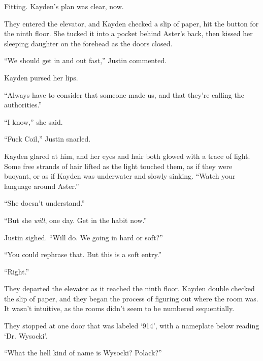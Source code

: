 Fitting.  Kayden's plan was clear, now.



They entered the elevator, and Kayden checked a slip of paper, hit the button for the ninth floor.  She tucked it into a pocket behind Aster's back, then kissed her sleeping daughter on the forehead as the doors closed.



``We should get in and out fast,'' Justin commented.



Kayden pursed her lips.



``Always have to consider that someone made us, and that they're calling the authorities.''



``I know,'' she said.



``Fuck Coil,'' Justin snarled.



Kayden glared at him, and her eyes and hair both glowed with a trace of light.  Some free strands of hair lifted as the light touched them, as if they were buoyant, or as if Kayden was underwater and slowly sinking.  ``Watch your language around Aster.''



``She doesn't understand.''



``But she \emph{will}, one day.  Get in the habit now.''



Justin sighed.  ``Will do.  We going in hard or soft?''



``You could rephrase that.  But this is a soft entry.''



``Right.''



They departed the elevator as it reached the ninth floor.  Kayden double checked the slip of paper, and they began the process of figuring out where the room was.  It wasn't intuitive, as the rooms didn't seem to be numbered sequentially.



They stopped at one door that was labeled `914', with a nameplate below reading `Dr. Wysocki'.



``What the hell kind of name is Wysocki?  Polack?''



